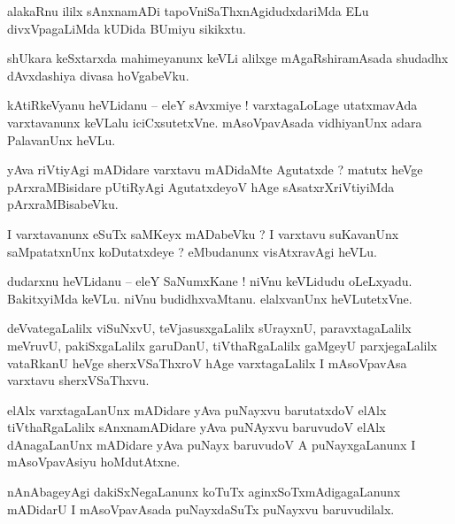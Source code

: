 \documentclass{article}
\begin{document}
\begin{mn}%
alakaRnu ililx sAnxnamADi tapoVniSaThxnAgidudxdariMda ELu divxVpagaLiMda kUDida BUmiyu sikikxtu.
\end{mn}

\begin{mn}%
shUkara keSxtarxda mahimeyanunx keVLi alilxge mAgaRshiramAsada shudadhx dAvxdashiya divasa 
hoVgabeVku.
\end{mn}

\begin{mn}%
kAtiRkeVyanu heVLidanu -- eleY sAvxmiye ! varxtagaLoLage utatxmavAda varxtavanunx keVLalu 
iciCxsutetxVne. mAsoVpavAsada vidhiyanUnx adara PalavanUnx heVLu.
\end{mn}

\begin{mn}%
yAva riVtiyAgi mADidare varxtavu mADidaMte Agutatxde ? matutx heVge pArxraMBisidare pUtiRyAgi 
AgutatxdeyoV hAge sAsatxrXriVtiyiMda pArxraMBisabeVku.
\end{mn}

\begin{mn}%
I varxtavanunx eSuTx saMKeyx mADabeVku ? I varxtavu suKavanUnx saMpatatxnUnx koDutatxdeye ? 
eMbudanunx visAtxravAgi heVLu.
\end{mn}

\begin{mn}%
dudarxnu heVLidanu -- eleY SaNumxKane ! niVnu keVLidudu oLeLxyadu. BakitxyiMda keVLu. niVnu 
budidhxvaMtanu. elalxvanUnx heVLutetxVne.
\end{mn}

\begin{mn}%
deVvategaLalilx viSuNxvU, teVjasusxgaLalilx sUrayxnU, paravxtagaLalilx meVruvU, pakiSxgaLalilx 
garuDanU, tiVthaRgaLalilx gaMgeyU parxjegaLalilx vataRkanU heVge sherxVSaThxroV hAge 
varxtagaLalilx I mAsoVpavAsa varxtavu sherxVSaThxvu.
\end{mn}

\begin{mn}%
elAlx varxtagaLanUnx mADidare yAva puNayxvu barutatxdoV elAlx tiVthaRgaLalilx sAnxnamADidare yAva 
puNAyxvu baruvudoV elAlx dAnagaLanUnx mADidare yAva puNayx baruvudoV A puNayxgaLanunx I  
mAsoVpavAsiyu hoMdutAtxne.
\end{mn}

\begin{mn}%
nAnAbageyAgi dakiSxNegaLanunx koTuTx aginxSoTxmAdigagaLanunx mADidarU I mAsoVpavAsada puNayxdaSuTx 
puNayxvu baruvudilalx.
\end{mn}
\end{document}
